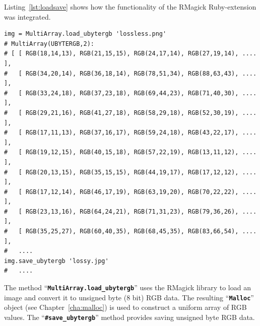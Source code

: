 \documentclass[12pt,a4paper,oneside,openright]{book}
\newcommand{\cha}[1]{Chapter~\ref{cha:#1}}
\newcommand{\lst}[1]{Listing~\ref{lst:#1}}
\newcommand{\code}[1]{``\texttt{\textbf{\textcolor{codegray}{\small{#1}}}}''}
\begin{document}
\begin{CJK}{UTF8}{}
\lst{loadsave} shows how the functionality of the RMagick Ruby-extension was integrated.
\lstset{language=Ruby,frame=single,numbers=none}
\begin{lstlisting}[float,caption={Loading and saving images},label=lst:loadsave]
img = MultiArray.load_ubytergb 'lossless.png'
# MultiArray(UBYTERGB,2):
# [ [ RGB(18,14,13), RGB(21,15,15), RGB(24,17,14), RGB(27,19,14), .... ],
#   [ RGB(34,20,14), RGB(36,18,14), RGB(78,51,34), RGB(88,63,43), .... ],
#   [ RGB(33,24,18), RGB(37,23,18), RGB(69,44,23), RGB(71,40,30), .... ],
#   [ RGB(29,21,16), RGB(41,27,18), RGB(58,29,18), RGB(52,30,19), .... ],
#   [ RGB(17,11,13), RGB(37,16,17), RGB(59,24,18), RGB(43,22,17), .... ],
#   [ RGB(19,12,15), RGB(40,15,18), RGB(57,22,19), RGB(13,11,12), .... ],
#   [ RGB(20,13,15), RGB(35,15,15), RGB(44,19,17), RGB(17,12,12), .... ],
#   [ RGB(17,12,14), RGB(46,17,19), RGB(63,19,20), RGB(70,22,22), .... ],
#   [ RGB(23,13,16), RGB(64,24,21), RGB(71,31,23), RGB(79,36,26), .... ],
#   [ RGB(35,25,27), RGB(60,40,35), RGB(68,45,35), RGB(83,66,54), .... ],
#   ....
img.save_ubytergb 'lossy.jpg'
#   ....
\end{lstlisting}
The method \code{MultiArray.load\_ubytergb} uses the RMagick library to load an image and convert it to unsigned byte (8 bit) \ac{RGB} data. The resulting \code{Malloc} object (see \cha{malloc}) is used to construct a uniform array of \ac{RGB} values. The \code{\#save\_ubytergb} method provides saving unsigned byte \ac{RGB} data.


\end{CJK}
\end{document}
